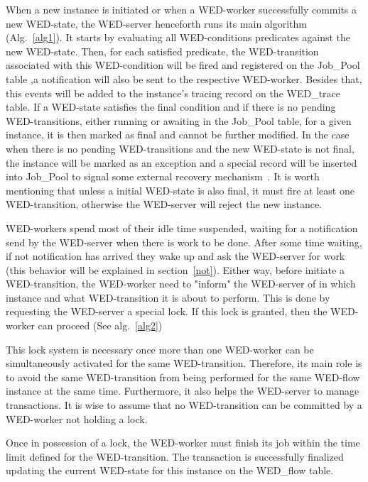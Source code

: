 \documentclass[conference]{IEEEtran}
\begin{document}
When a new instance is initiated or when a WED-worker successfully commits a new WED-state, the WED-server henceforth runs 
its main algorithm (Alg.~\ref{alg1}). It starts by evaluating all WED-conditions predicates against the new WED-state. Then, for
each satisfied predicate, the WED-transition associated with this WED-condition will be fired and registered on the Job\_Pool table
,a notification will also be sent to the respective WED-worker. Besides that, this events will be added to the instance's
tracing record on the WED\_trace table. If a WED-state satisfies the final condition and if there is no pending WED-transitions,
either running or awaiting in the Job\_Pool table, for a given instance, it is then marked as final and cannot be further
modified. In the case when there is no pending WED-transitions and the new WED-state is not final, the instance will be
marked as an exception and a special record will be inserted into Job\_Pool to signal some external recovery mechanism~\cite{ICWS12}.
It is worth mentioning that unless a initial WED-state is also final, it must fire 
at least one WED-transition, otherwise the WED-server will reject the new instance. 

\par  WED-workers spend most of their idle time suspended, waiting for a notification send by the WED-server when there is work 
to be done. After some time waiting, if not notification has arrived they wake up and ask the WED-server for work (this
behavior will be explained in section~\ref{not}). Either way, before initiate a WED-transition, the WED-worker need to 
"inform" the WED-server of in which instance and what WED-transition it is about to perform. This is done by requesting the
WED-server a special lock. If this lock is granted, then the WED-worker can proceed (See alg.~\ref{alg2})

\par This lock system is necessary once more than one WED-worker can be simultaneously activated for the same WED-transition.
Therefore, its main role is to avoid the same WED-transition from being performed for the same WED-flow instance at the
same time. Furthermore, it also helps the WED-server to manage transactions. It is wise to assume that no WED-transition
can be committed by a WED-worker not holding a lock.

\par Once in possession of a lock, the WED-worker must finish its job within the time limit defined for the WED-transition.
The transaction is successfully finalized updating the current WED-state for this instance on the WED\_flow table.
\end{document}
